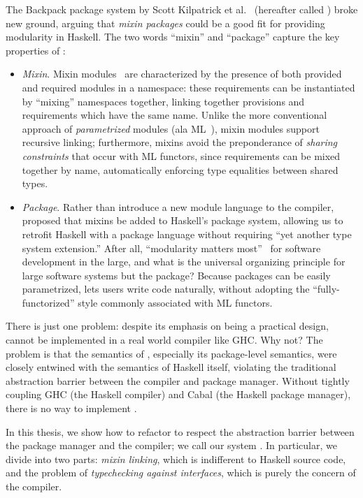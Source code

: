 The Backpack package system by Scott Kilpatrick et al.~\cite{backpack}
(hereafter called \OldBackpack{}) broke new ground, arguing that \emph{mixin
packages} could be a good fit for providing modularity in Haskell.
The two words ``mixin'' and ``package'' capture the key properties of \OldBackpack{}:

\begin{itemize}
    \item \emph{Mixin}. Mixin modules~\cite{bracha+:modularity,ancona+:cms,flatt+:units,duggan:mixin} are characterized by the
    presence of both provided and required modules in a namespace:
    these requirements can be instantiated by ``mixing'' namespaces
    together, linking together provisions and requirements which have
    the same name.  Unlike the more conventional approach of
    \emph{parametrized} modules (ala ML~\cite{milner+:def-of-sml-revised}),
    mixin modules support recursive linking;  furthermore, mixins avoid
    the preponderance of \emph{sharing constraints} that occur with ML
    functors, since requirements can be mixed together by name, automatically
    enforcing type equalities between shared types.

    \item \emph{Package}. Rather than introduce a new module language
    to the compiler, \OldBackpack{} proposed that mixins be added to
    Haskell's package system, allowing us to retrofit Haskell with
    a package language without requiring ``yet another type system extension.''
    After all, ``modularity matters most''~\cite{mmm} for software development in
    the large, and what is the universal organizing principle for large
    software systems but the package?  Because packages can be easily
    parametrized, \OldBackpack{} lets users write code naturally, without
    adopting the ``fully-functorized'' style
    commonly associated with ML functors.
\end{itemize}
%
There is just one problem: despite its emphasis on being a practical
design, \OldBackpack{} cannot be implemented in a real world compiler
like GHC\@.  Why not? The problem is that the
semantics of \OldBackpack{}, especially its package-level semantics,
were closely entwined with the semantics of Haskell itself,  violating
the traditional abstraction barrier between the compiler and package
manager.  Without tightly coupling GHC (the Haskell compiler) and Cabal
(the Haskell package manager), there is no way to implement
\OldBackpack{}.

In this thesis, we show how to refactor
\OldBackpack{} to respect the abstraction barrier between the package
manager and the compiler; we call our system \Backpack{}.  In
particular, we divide \Backpack{} into two parts: \emph{mixin linking},
which is indifferent to Haskell source code, and the problem of
\emph{typechecking against interfaces}, which is purely the concern of
the compiler.

